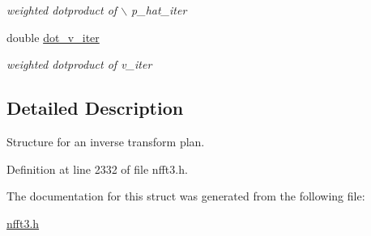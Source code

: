 \begin{CompactItemize}
\begin{CompactList}\small\item\em weighted dotproduct of $\backslash$ p\_\-hat\_\-iter \item\end{CompactList}\item 
\hypertarget{structinfct__plan_o17}{
double \hyperlink{structinfct__plan_o17}{dot\_\-v\_\-iter}}
\label{structinfct__plan_o17}

\begin{CompactList}\small\item\em weighted dotproduct of v\_\-iter \item\end{CompactList}\end{CompactItemize}


\subsection{Detailed Description}
Structure for an inverse transform plan. 



Definition at line 2332 of file nfft3.h.

The documentation for this struct was generated from the following file:\begin{CompactItemize}
\item 
\hyperlink{nfft3_8h}{nfft3.h}\end{CompactItemize}
